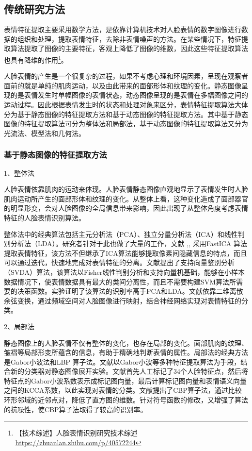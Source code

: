 \subsection{传统研究方法}

表情特征提取主要采用数学方法，是依靠计算机技术对人脸表情的数字图像进行数据的组织和处理，提取表情特征，去除非表情噪声的方法。在某些情况下，特征提取算法提取了图像的主要特征，客观上降低了图像的维数，因此这些特征提取算法也具有降维的作用\footnote{【技术综述】人脸表情识别研究技术综述 \quad \url{https://zhuanlan.zhihu.com/p/40572244}}。

人脸表情的产生是一个很复杂的过程，如果不考虑心理和环境因素，呈现在观察者面前的就是单纯的肌肉运动，以及由此带来的面部形体和纹理的变化。静态图像呈现的是表情发生时单幅图像的表情状态，动态图像呈现的是表情在多幅图像之间的运动过程。因此根据表情发生时的状态和处理对象来区分，表情特征提取算法大体分为基于静态图像的特征提取方法和基于动态图像的特征提取方法。其中基于静态图像的特征提取算法可分为整体法和局部法，基于动态图像的特征提取算法又分为光流法、模型法和几何法。

\subsubsection{基于静态图像的特征提取方法}

1、整体法

人脸表情依靠肌肉的运动来体现。人脸表情静态图像直观地显示了表情发生时人脸肌肉运动所产生的面部形体和纹理的变化。从整体上看，这种变化造成了面部器官的明显形变，会对人脸图像的全局信息带来影响，因此出现了从整体角度考虑表情特征的人脸表情识别算法。

整体法中的经典算法包括主元分析法（PCA）、独立分量分析法（ICA）和线性判别分析法（LDA）。研究者针对于此也做了大量的工作，文献
\cite{renlianbiaoqingshibie},\cite{jiyuICAyu}, \cite{renlianbiaoqingshibie1}采用FastICA 算法提取表情特征，该方法不但继承了ICA算法能够提取像素间隐藏信息的特点，而且可以通过迭代，快速地完成对表情特征的分离。文献\cite{zhichixiangliangjianbie}提出了支持向量鉴别分析（SVDA）算法，该算法以Fisher线性判别分析和支持向量机基础，能够在小样本数据情况下，使表情数据具有最大的类间分离性，而且不需要构建SVM算法所需要的决策函数。实验证明了该算法的识别率高于PCA和LDA。文献\cite{ma2001facial}依靠二维离散余弦变换，通过频域空间对人脸图像进行映射，结合神经网络实现对表情特征的分类。

2、局部法

静态图像上的人脸表情不仅有整体的变化，也存在局部的变化。面部肌肉的纹理、皱褶等局部形变所蕴含的信息，有助于精确地判断表情的属性。局部法的经典方法是Gabor小波法和LBP 算子法。文献\cite{kyperountas2010salient}以Gabor小波等多种特征提取算法为手段，结合新的分类器对静态图像展开实验。文献\cite{zheng2006facial}首先人工标记了34个人脸特征点，然后将特征点的Gabor小波系数表示成标记图向量，最后计算标记图向量和表情语义向量之间的KCCA系数，以此实现对表情的分类。文献\cite{Fuxiaofen0}提出了CBP算子法，通过比较环形邻域的近邻点对，降低了直方图的维数。针对符号函数的修改，又增强了算法的抗噪性，使CBP算子法取得了较高的识别率。

